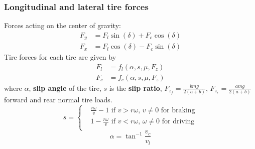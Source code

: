 \documentclass{beamer}
\begin{document}
\begin{frame}
	\frametitle{Longitudinal and lateral tire forces}
	Forces acting on the center of gravity:
	\begin{subequations} 
		\begin{align} F_y &= F_{l}\sin(\delta) + F_{c}\cos(\delta) \label{eqn:longitudinal_tire_force_COG} \\
		F_x &= F_{l}\cos(\delta) - F_{c}\sin(\delta) 	 \label{eqn:lateral_tire_foce_COG} 
		\end{align} 
	\end{subequations}
	Tire forces for each tire are given by
	\begin{subequations} 
		\begin{align} F_l &= f_{l}(\alpha,s,\mu,F_z) \label{eqn:longitudinal_tire_force} \\
		F_c &= f_{c}(\alpha,s,\mu,F_z) 	 \label{eqn:lateral_tire_foce} 
		\end{align} 
	\end{subequations}
	where $\alpha$, \textbf{slip angle} of the tire, $s$ is the \textbf{slip ratio}, $F_{z_{f}} = \frac{bmg}{2(a+b)}$, $F_{z_{r}} =\frac{amg}{2(a+b)}$ forward and rear normal tire loads. 	
	\begin{equation}
	\label{eqn:slip_ratio}
	s =
	\begin{cases}
	& \frac{r\omega}{v} - 1 \,\,\text{if}\,\, v > r\omega, \,v \neq 0 \,\, \text{for braking}  \\
	& 1- \frac{r\omega}{v} \,\,\text{if}\,\, v < r\omega, \,\omega \neq 0 \,\, \text{for driving}\\
	\end{cases}   
	\end{equation} 
	\begin{equation}
	\label{eqn:slip_angle}
	\alpha = \tan^{-1}\frac{v_{c}}{v_{l}}
	\end{equation} 
\end{frame}
\end{document}
